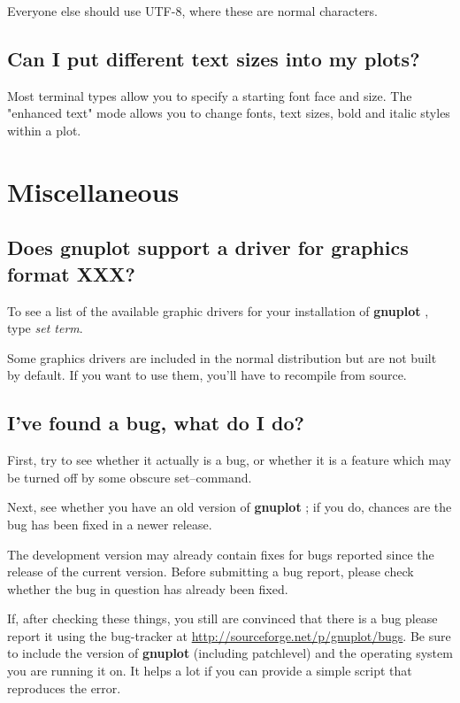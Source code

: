 \documentclass[a4paper,11pt]{article}
\def\http#1{{\small\href{http://#1}{\url{http://#1}}}}
\newcommand{\http}[1]%
            {\htmladdnormallink{\latex{\url{http://#1}}%
                    \html{\textit{http://#1}}}%
                {http://#1}%
            }
\newcommand{\gnuplot}{\textbf{gnuplot }}
\begin{document}
Everyone else should use UTF-8, where these are normal characters.

\subsection{Can I put different text sizes into my plots?}

Most terminal types allow you to specify a starting font face and size.
The "enhanced text" mode allows you to change fonts, text sizes, bold and
italic styles within a plot.



\section{Miscellaneous}

\subsection{Does \gnuplot support a driver for graphics format XXX?}

To see a list of the available graphic drivers for your installation of
\gnuplot, type {\em set term}.

Some graphics drivers are included in the normal distribution
but are not built by default. If you want to use them, you'll
have to recompile from source.

\subsection{I've found a bug, what do I do?}

First, try to see whether it actually is a bug, or whether it
is a feature which may be turned off by some obscure set--command.

Next, see whether you have an old version of \gnuplot; if you do,
chances are the bug has been fixed in a newer release.

The development version may already contain fixes for bugs reported
since the release of the current version.
Before submitting a bug report, please check whether the bug in question
has already been fixed.

If, after checking these things, you still are convinced that there is a
bug please report it using the bug-tracker at
\http{sourceforge.net/p/gnuplot/bugs}.
Be sure to include the version of \gnuplot (including patchlevel) and
the operating system you are running it on.
It helps a lot if you can provide a simple script that reproduces the error.
\end{document}
